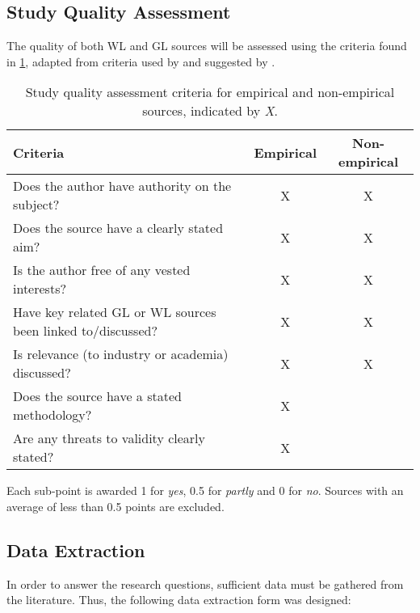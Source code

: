 \subsection{Study Quality Assessment}
The quality of both WL and GL sources will be assessed using the criteria found in \cref{tab:study_quality_criteria}, adapted from criteria used by \cite{Giray2021} and suggested by \cite{Garousi2016}. 

\begin{table}[h]
    \centering
    \begin{tabular}{l c c}
        Criteria & Empirical & Non-empirical \\
        \hline
        Does the author have authority on the subject? & X & X \\
        Does the source have a clearly stated aim? & X & X \\
        Is the author free of any vested interests? & X & X \\
        Have key related GL or WL sources been linked to/discussed? & X & X \\
        Is relevance (to industry or academia) discussed? & X & X \\
        Does the source have a stated methodology? & X &  \\
        Are any threats to validity clearly stated? & X & \\
    \end{tabular}
    \caption{Study quality assessment criteria for empirical and non-empirical sources, indicated by \emph{X}.}
    \label{tab:study_quality_criteria}
\end{table}
Each sub-point is awarded 1 for \emph{yes}, 0.5 for \emph{partly} and 0 for \emph{no}.
Sources with an average of less than 0.5 points are excluded.

\subsection{Data Extraction}
In order to answer the research questions, sufficient data must be gathered from the literature.
Thus, the following data extraction form was designed:


